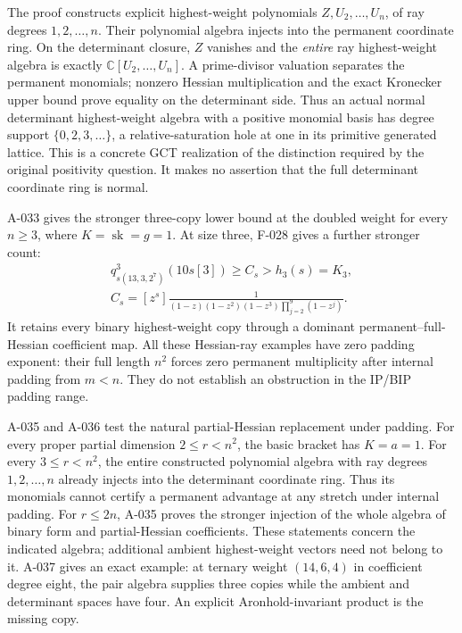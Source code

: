 The proof constructs explicit highest-weight polynomials
\(Z,U_2,\ldots,U_n\), of ray degrees \(1,2,\ldots,n\).
Their polynomial algebra injects into the permanent coordinate ring.
On the determinant closure, \(Z\) vanishes and the \emph{entire}
ray highest-weight algebra is exactly \(\mathbb C[U_2,\ldots,U_n]\).
A prime-divisor valuation separates the permanent monomials;
nonzero Hessian multiplication and the exact Kronecker upper bound
prove equality on the determinant side.
Thus an actual normal determinant highest-weight algebra with a
positive monomial basis has degree support
\(\{0,2,3,\ldots\}\), a relative-saturation hole at one in its
primitive generated lattice. This is a concrete GCT realization
of the distinction required by the original positivity question.
It makes no assertion that the full determinant coordinate ring is normal.

A-033 gives the stronger three-copy lower bound at the doubled
weight for every \(n\geq3\), where \(K=\operatorname{sk}=g=1\).
At size three, F-028 gives a further stronger count:
\[
 \begin{gathered}
 q^3_{s(13,3,2^7)}(10s[3])\geq C_s>h_3(s)=K_3,\\
 C_s=[z^s]\frac{1}
 {(1-z)(1-z^2)(1-z^3)\prod_{j=2}^{9}(1-z^j)}.
 \end{gathered}
\]
It retains every binary highest-weight copy through a dominant
permanent--full-Hessian coefficient map. All these Hessian-ray
examples have zero padding exponent: their full length \(n^2\)
forces zero permanent multiplicity after internal padding from \(m<n\).
They do not establish an obstruction in the IP/BIP padding range.

A-035 and A-036 test the natural partial-Hessian replacement under
padding. For every proper partial dimension \(2\leq r<n^2\), the
basic bracket has \(K=a=1\). For every \(3\leq r<n^2\), the entire
constructed polynomial algebra with ray degrees \(1,2,\ldots,n\)
already injects into the determinant coordinate ring. Thus its
monomials cannot certify a permanent advantage at any stretch under
internal padding. For \(r\leq2n\), A-035 proves the stronger injection
of the whole algebra of binary form and partial-Hessian coefficients.
These statements concern the indicated algebra; additional ambient
highest-weight vectors need not belong to it. A-037 gives an exact
example: at ternary weight \((14,6,4)\) in coefficient degree eight,
the pair algebra supplies three copies while the ambient and determinant
spaces have four. An explicit Aronhold-invariant product is the missing
copy.

